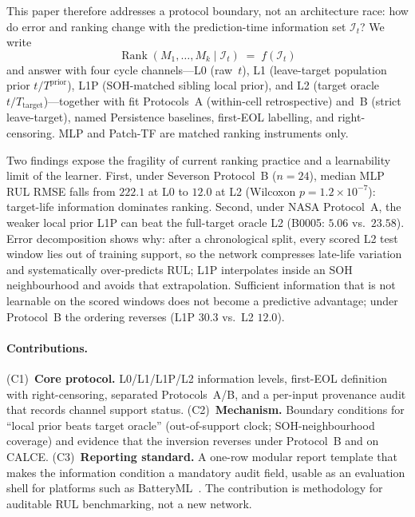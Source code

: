 \documentclass[preprint,12pt]{elsarticle}
\begin{document}
This paper therefore addresses a protocol boundary, not an architecture race: how do error and ranking change with the prediction-time information set $\mathcal{I}_t$?
We write
\begin{equation}
\boxed{\operatorname{Rank}(M_1,\ldots,M_k\mid \mathcal{I}_t)\;=\;f(\mathcal{I}_t)}
\end{equation}
and answer with four cycle channels---L0 (raw~$t$), L1 (leave-target population prior $t/T^{\mathrm{prior}}$), L1P (SOH-matched sibling local prior), and L2 (target oracle $t/T_{\mathrm{target}}$)---together with fit Protocols~A (within-cell retrospective) and~B (strict leave-target), named Persistence baselines, first-EOL labelling, and right-censoring.
MLP and Patch-TF are matched ranking instruments only.

Two findings expose the fragility of current ranking practice and a learnability limit of the learner.
First, under Severson Protocol~B ($n{=}24$), median MLP RUL RMSE falls from $222.1$ at L0 to $12.0$ at L2 (Wilcoxon $p=1.2{\times}10^{-7}$): target-life information dominates ranking.
Second, under NASA Protocol~A, the weaker local prior L1P can beat the full-target oracle L2 (B0005: $5.06$ vs.\ $23.58$).
Error decomposition shows why: after a chronological split, every scored L2 test window lies out of training support, so the network compresses late-life variation and systematically over-predicts RUL; L1P interpolates inside an SOH neighbourhood and avoids that extrapolation.
Sufficient information that is not learnable on the scored windows does not become a predictive advantage; under Protocol~B the ordering reverses (L1P $30.3$ vs.\ L2 $12.0$).

\paragraph{Contributions.}
(C1)~\textbf{Core protocol.}
L0/L1/L1P/L2 information levels, first-EOL definition with right-censoring, separated Protocols~A/B, and a per-input provenance audit that records channel support status.
(C2)~\textbf{Mechanism.}
Boundary conditions for ``local prior beats target oracle'' (out-of-support clock; SOH-neighbourhood coverage) and evidence that the inversion reverses under Protocol~B and on CALCE.
(C3)~\textbf{Reporting standard.}
A one-row modular report template that makes the information condition a mandatory audit field, usable as an evaluation shell for platforms such as BatteryML~\cite{zhang2024batteryml}.
The contribution is methodology for auditable RUL benchmarking, not a new network.
\end{document}
